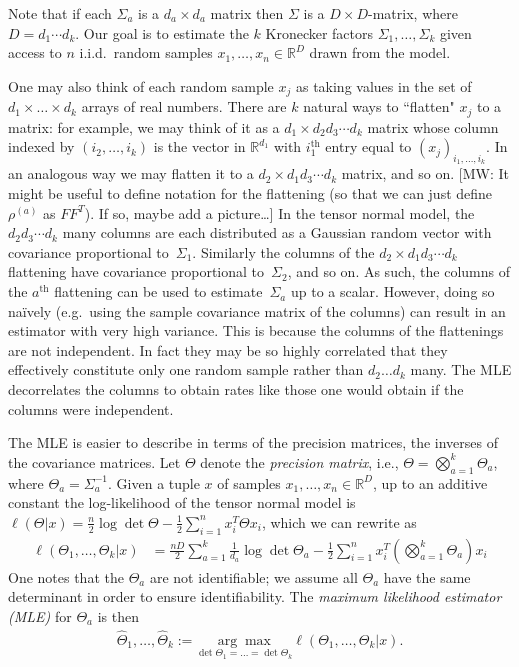 \documentclass[aos]{imsart}
\theoremstyle{definition}
\newcommand{\R}{{\mathbb{R}}}
\newcommand{\samp}{x}
\newcommand{\MW}[1]{{\color{red}[MW: #1]}}
\begin{document}
\noindent
Note that if each $\Sigma_a$ is a $d_a\times d_a$ matrix then $\Sigma$ is a $D\times D$-matrix, where $D=d_1 \cdots d_k$.
Our goal is to estimate the $k$ Kronecker factors $\Sigma_1, \dots, \Sigma_k$ given access to $n$ i.i.d.\ random samples $x_1, \dots, x_n \in \R^D$ drawn from the model.

One may also think of each random sample $x_j$ as taking values in the set of $d_1 \times \dots \times d_k$ arrays of real numbers.
There are $k$ natural ways to ``flatten" $x_j$ to a matrix:
for example, we may think of it as a $d_1 \times d_2d_3\cdots{}d_k$ matrix whose column indexed by $(i_2,\dots, i_k)$ is the vector in $\R^{d_1}$ with $i_1^{\text{th}}$ entry equal to $(x_j)_{i_1, \dots, i_k}$.
In an analogous way we may flatten it to a $d_2 \times d_1d_3\cdots{}d_k$ matrix, and so on.
\MW{It might be useful to define notation for the flattening (so that we can just define $\rho^{(a)}$ as $FF^T$). If so, maybe add a picture\dots}
In the tensor normal model, the $d_2d_3\cdots{}d_k$ many columns are each distributed as a Gaussian random vector with covariance proportional to~$\Sigma_1$.
Similarly the columns of the $d_2 \times d_1d_3\cdots{}d_k$ flattening have covariance proportional to~$\Sigma_2$, and so on.
As such, the columns of the $a^{\text{th}}$ flattening can be used to estimate~$\Sigma_a$ up to a scalar.
However, doing so na\"ively (e.g.\ using the sample covariance matrix of the columns) can result in an estimator with very high variance.
This is because the columns of the flattenings are not independent.
In fact they may be so highly correlated that they effectively constitute only one random sample rather than $d_2\dots d_k$ many.
The MLE decorrelates the columns to obtain rates like those one would obtain if the columns were independent.

The MLE is easier to describe in terms of the precision matrices, the inverses of the covariance matrices.
Let $\Theta$ denote the \emph{precision matrix}, i.e., $\Theta = \bigotimes_{a=1}^k \Theta_a$, where $\Theta_a = \Sigma_a^{-1}$.
Given a tuple $x$ of samples $\samp_1,\dots,\samp_n\in\R^D$, up to an additive constant the log-likelihood of the tensor normal model is
$\ell(\Theta|x) = \frac{n}2 \log \det \Theta - \frac12 \sum_{i=1}^n x_i^T \Theta x_i$, which we can rewrite as
\begin{align*}
  \ell(\Theta_1, \dots, \Theta_k|x)
&= \frac{n D}2 \sum_{a=1}^k \frac1{d_a} \log \det \Theta_a  - \frac12 \sum_{i=1}^n x_i^T \left( \textstyle\bigotimes_{a=1}^k \Theta_a \right) x_i
\end{align*}
One notes that the $\Theta_a$ are not identifiable; we assume all $\Theta_a$ have the same determinant in order to ensure identifiability.
The \emph{maximum likelihood estimator (MLE)} for $\Theta_a$ is then
\begin{align*}
  \widehat{\Theta}_1, \dots, \widehat{\Theta}_k := \underset{\det \Theta_1 = \ldots = \det \Theta_k}{ \arg\max} \ell(\Theta_1, \dots, \Theta_k|x).
\end{align*}
\end{document}
